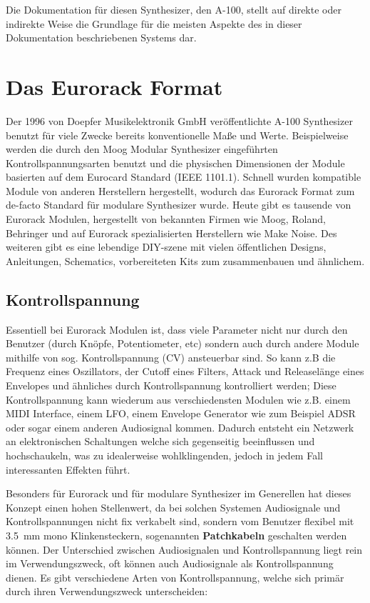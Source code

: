 Die Dokumentation für diesen Synthesizer, den A-100, stellt auf direkte oder indirekte Weise die Grundlage für die meisten Aspekte des in dieser Dokumentation beschriebenen Systems dar.

\section{Das Eurorack Format}
\label{sec:org68993ec}

Der 1996 von Doepfer Musikelektronik GmbH veröffentlichte A-100 Synthesizer benutzt für viele Zwecke bereits konventionelle Maße und Werte. Beispielweise werden die durch den Moog Modular Synthesizer eingeführten Kontrollspannungsarten benutzt und die physischen Dimensionen der Module basierten auf dem Eurocard Standard (IEEE 1101.1). Schnell wurden kompatible Module von anderen Herstellern hergestellt, wodurch das Eurorack Format zum de-facto Standard für modulare Synthesizer wurde. Heute gibt es tausende von Eurorack Modulen, hergestellt von bekannten Firmen wie Moog, Roland, Behringer und auf Eurorack spezialisierten Herstellern wie Make Noise. Des weiteren gibt es eine lebendige DIY-szene mit vielen öffentlichen Designs, Anleitungen, Schematics, vorbereiteten Kits zum zusammenbauen und ähnlichem.

\subsection{Kontrollspannung}
\label{sec:orgd66cf3c}
Essentiell bei Eurorack Modulen ist, dass viele Parameter nicht nur durch den Benutzer (durch Knöpfe, Potentiometer, etc) sondern auch durch andere Module mithilfe von sog. Kontrollspannung (CV) ansteuerbar sind. So kann z.B die Frequenz eines Oszillators, der Cutoff eines Filters, Attack und Releaselänge eines Envelopes und ähnliches durch Kontrollspannung kontrolliert werden; Diese Kontrollspannung kann wiederum aus verschiedensten Modulen wie z.B. einem MIDI Interface, einem LFO, einem Envelope Generator wie zum Beispiel ADSR oder sogar einem anderen Audiosignal kommen. Dadurch entsteht ein Netzwerk an elektronischen Schaltungen welche sich gegenseitig beeinflussen und hochschaukeln, was zu idealerweise wohlklingenden, jedoch in jedem Fall interessanten Effekten führt.

Besonders für Eurorack und für modulare Synthesizer im Generellen hat dieses Konzept einen hohen Stellenwert, da bei solchen Systemen Audiosignale und Kontrollspannungen nicht fix verkabelt sind, sondern vom Benutzer flexibel mit \SI{3.5}{\milli\meter} mono Klinkensteckern, sogenannten \textbf{Patchkabeln} geschalten werden können. Der Unterschied zwischen Audiosignalen und Kontrollspannung liegt rein im Verwendungszweck, oft können auch Audiosignale als Kontrollspannung dienen. Es gibt verschiedene Arten von Kontrollspannung, welche sich primär durch ihren Verwendungszweck unterscheiden:

